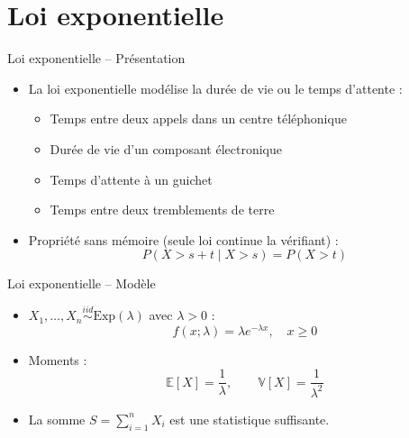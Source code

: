 \documentclass[11pt,aspectratio=169]{beamer}
\begin{document}
\section{Loi exponentielle}

\begin{frame}{Loi exponentielle -- Présentation}

\begin{itemize}

\item La loi exponentielle modélise la durée de vie ou le temps d'attente :\newline
  \begin{itemize}
    \item Temps entre deux appels dans un centre téléphonique\newline
    \item Durée de vie d'un composant électronique\newline
    \item Temps d'attente à un guichet\newline
    \item Temps entre deux tremblements de terre\newline
  \end{itemize}

\item Propriété sans mémoire (seule loi continue la vérifiant) :
  \[
  P(X > s + t \mid X > s) = P(X > t)
  \]

\end{itemize}

\end{frame}

\begin{frame}{Loi exponentielle -- Modèle}

\begin{itemize}

\item $X_1, \ldots, X_n \overset{iid}{\sim} \text{Exp}(\lambda)$ avec $\lambda > 0$ :
  \[
  f(x; \lambda) = \lambda e^{-\lambda x}, \quad x \geq 0
  \]

\item Moments :
  \[
  \mathbb{E}[X] = \frac{1}{\lambda}, \qquad \mathbb{V}[X] = \frac{1}{\lambda^2}
  \]

\item La somme $S = \sum_{i=1}^n X_i$ est une statistique suffisante.

\end{itemize}

\end{frame}
\end{document}
